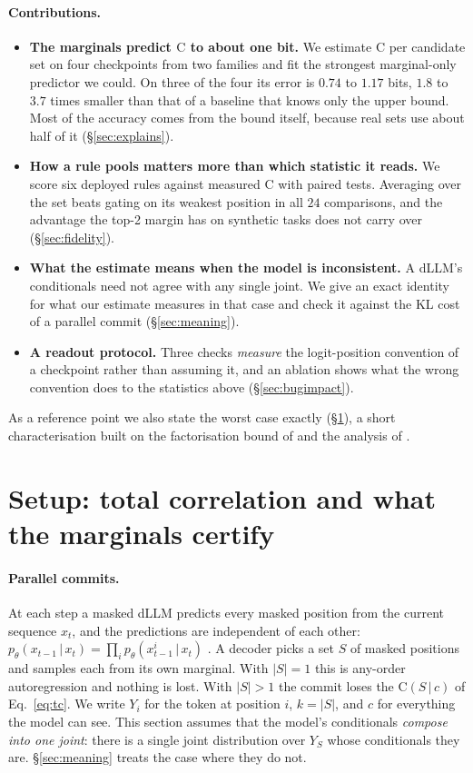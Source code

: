 \documentclass{article}
\newcommand{\C}{\mathrm{C}}
\newcommand{\given}{\,\vert\,}
\begin{document}
\paragraph{Contributions.}
\begin{itemize}\setlength{\itemsep}{1pt}\setlength{\parskip}{0pt}\setlength{\topsep}{2pt}
\item \textbf{The marginals predict $\C$ to about one bit.} We estimate $\C$ per
candidate set on four checkpoints from two families and fit the strongest marginal-only
predictor we could. On three of the four its error is $0.74$ to $1.17$ bits, $1.8$ to
$3.7$ times smaller than that of a baseline that knows only the upper bound. Most of the
accuracy comes from the bound itself, because real sets use about half of it
(\S\ref{sec:explains}).
\item \textbf{How a rule pools matters more than which statistic it reads.} We score six
deployed rules against measured $\C$ with paired tests. Averaging over the set beats
gating on its weakest position in all $24$ comparisons, and the advantage the top-2
margin has on synthetic tasks does not carry over (\S\ref{sec:fidelity}).
\item \textbf{What the estimate means when the model is inconsistent.} A dLLM's
conditionals need not agree with any single joint. We give an exact identity for what
our estimate measures in that case and check it against the KL cost of a parallel commit
(\S\ref{sec:meaning}).
\item \textbf{A readout protocol.} Three checks \emph{measure} the logit-position
convention of a checkpoint rather than assuming it, and an ablation shows what the
wrong convention does to the statistics above (\S\ref{sec:bugimpact}).
\end{itemize}
As a reference point we also state the worst case exactly (\S\ref{sec:worstcase}), a
short characterisation built on the factorisation bound of \cite[Thm.~1]{huang} and the
analysis of \cite[\S4]{parallelbench}.

\section{Setup: total correlation and what the marginals certify}
\label{sec:worstcase}

\paragraph{Parallel commits.} At each step a masked dLLM predicts every masked position
from the current sequence $x_t$, and the predictions are independent of each other:
$p_\theta(x_{t-1}\given x_t)=\prod_i p_\theta(x^i_{t-1}\given x_t)$ \cite{mdlm,md4}. A
decoder picks a set $S$ of masked positions and samples each from its own marginal. With
$|S|=1$ this is any-order autoregression and nothing is lost. With $|S|>1$ the commit
loses the $\C(S\given c)$ of Eq.~\eqref{eq:tc}. We write $Y_i$ for the token at position
$i$, $k=|S|$, and $c$ for everything the model can see. This section assumes that the
model's conditionals \emph{compose into one joint}: there is a single joint distribution
over $Y_S$ whose conditionals they are. \S\ref{sec:meaning} treats the
case where they do not.
\end{document}

